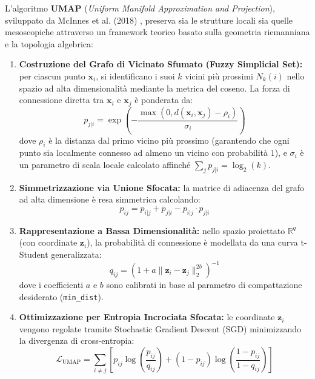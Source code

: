 L'algoritmo \textbf{UMAP} (\textit{Uniform Manifold Approximation and Projection}), sviluppato da McInnes et al. (2018) \cite{mcinnes2018}, preserva sia le strutture locali sia quelle mesoscopiche attraverso un framework teorico basato sulla geometria riemanniana e la topologia algebrica:
\begin{enumerate}
    \item \textbf{Costruzione del Grafo di Vicinato Sfumato (Fuzzy Simplicial Set):} per ciascun punto $\mathbf{x}_i$, si identificano i suoi $k$ vicini più prossimi $N_k(i)$ nello spazio ad alta dimensionalità mediante la metrica del coseno. La forza di connessione diretta tra $\mathbf{x}_i$ e $\mathbf{x}_j$ è ponderata da:
    \begin{equation}
        p_{j|i} = \exp\left( - \frac{\max(0, d(\mathbf{x}_i, \mathbf{x}_j) - \rho_i)}{\sigma_i} \right)
    \end{equation}
    dove $\rho_i$ è la distanza dal primo vicino più prossimo (garantendo che ogni punto sia localmente connesso ad almeno un vicino con probabilità $1$), e $\sigma_i$ è un parametro di scala locale calcolato affinché $\sum_{j} p_{j|i} = \log_2(k)$.
    \item \textbf{Simmetrizzazione via Unione Sfocata:} la matrice di adiacenza del grafo ad alta dimensione è resa simmetrica calcolando:
    \begin{equation}
        p_{ij} = p_{i|j} + p_{j|i} - p_{i|j} \cdot p_{j|i}
    \end{equation}
    \item \textbf{Rappresentazione a Bassa Dimensionalità:} nello spazio proiettato $\mathbb{R}^q$ (con coordinate $\mathbf{z}_i$), la probabilità di connessione è modellata da una curva t-Student generalizzata:
    \begin{equation}
        q_{ij} = \left( 1 + a \|\mathbf{z}_i - \mathbf{z}_j\|_2^{2b} \right)^{-1}
    \end{equation}
    dove i coefficienti $a$ e $b$ sono calibrati in base al parametro di compattazione desiderato (\texttt{min\_dist}).
    \item \textbf{Ottimizzazione per Entropia Incrociata Sfocata:} le coordinate $\mathbf{z}_i$ vengono regolate tramite Stochastic Gradient Descent (SGD) minimizzando la divergenza di cross-entropia:
    \begin{equation}
        \mathcal{L}_{\text{UMAP}} = \sum_{i \ne j} \left[ p_{ij} \log\left( \frac{p_{ij}}{q_{ij}} \right) + (1 - p_{ij}) \log\left( \frac{1 - p_{ij}}{1 - q_{ij}} \right) \right]
    \end{equation}
\end{enumerate}


